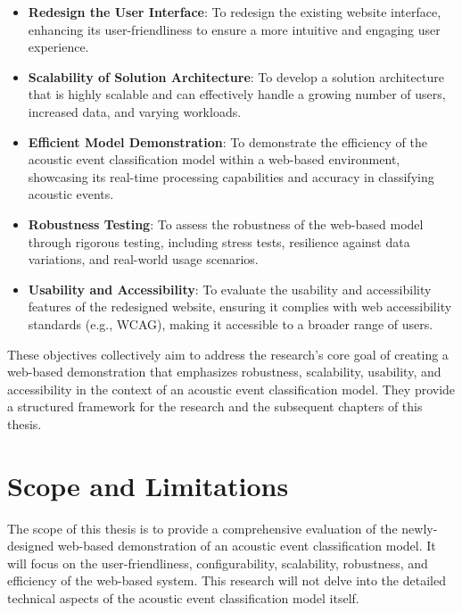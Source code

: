 \begin{itemize}
  \item \textbf{Redesign the User Interface}: To redesign the existing website interface, enhancing its user-friendliness to ensure a more intuitive and engaging user experience.
  \item \textbf{Scalability of Solution Architecture}: To develop a solution architecture that is highly scalable and can effectively handle a growing number of users, increased data, and varying workloads.
  \item \textbf{Efficient Model Demonstration}: To demonstrate the efficiency of the acoustic event classification model within a web-based environment, showcasing its real-time processing capabilities and accuracy in classifying acoustic events.
  \item \textbf{Robustness Testing}: To assess the robustness of the web-based model through rigorous testing, including stress tests, resilience against data variations, and real-world usage scenarios.
  \item \textbf{Usability and Accessibility}: To evaluate the usability and accessibility features of the redesigned website, ensuring it complies with web accessibility standards (e.g., WCAG), making it accessible to a broader range of users.
\end{itemize}

These objectives collectively aim to address the research's core goal of creating a web-based demonstration that emphasizes robustness, scalability, usability, and accessibility in the context of an acoustic event classification model. They provide a structured framework for the research and the subsequent chapters of this thesis.

\section{Scope and Limitations}

The scope of this thesis is to provide a comprehensive evaluation of the newly-designed web-based demonstration of an acoustic event classification model. It will focus on the user-friendliness, configurability, scalability, robustness, and efficiency of the web-based system. This research will not delve into the detailed technical aspects of the acoustic event classification model itself.

